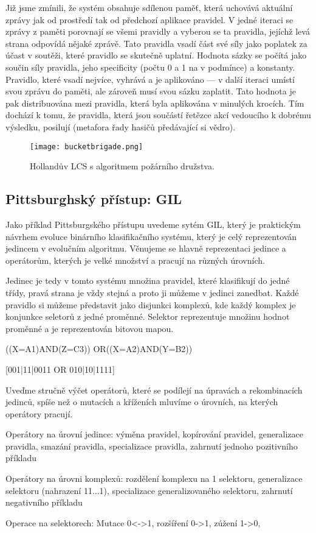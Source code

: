 Již jsme zmínili, že systém obsahuje sdílenou paměť, která uchovává aktuální zprávy jak od prostředí tak od předchozí aplikace pravidel. V jedné iteraci se zprávy z paměti porovnají se všemi pravidly a vyberou se ta pravidla, jejíchž levá strana odpovídá nějaké zprávě. Tato pravidla vsadí část své síly jako poplatek za účast v soutěži, které pravidlo se skutečně uplatní. Hodnota sázky se počítá jako součin síly pravidla, jeho specificity (počtu 0 a 1 na v podmínce) a konstanty. Pravidlo, které vsadí nejvíce, vyhrává a je aplikováno --- v další iteraci umístí svou zprávu do paměti, ale zároveň musí svou sázku zaplatit. Tato hodnota je pak distribuována mezi pravidla, která byla aplikována v minulých krocích. Tím dochází k tomu, že pravidla, která jsou součástí řetězce akcí vedoucího k dobrému výsledku, posilují (metafora řady hasičů předávající si vědro).

\begin{figure}
\texttt{[image: bucketbrigade.png]}
\caption{Hollandův LCS s algoritmem požárního družstva.}
\end{figure}


\subsection{Pittsburghský přístup: GIL}

Jako příklad Pittsburgského přístupu uvedeme sytém GIL, který je praktickým návrhem evoluce binárního klasifikačního systému, který je celý reprezentován jedincem v evolučním algoritmu. Věnujeme se hlavně reprezentaci jedince a operátorům, kterých je velké množství a pracují na různých úrovních.

Jedinec je tedy v tomto systému množina pravidel, které klasifikují do jedné třídy, pravá strana je vždy stejná a proto ji můžeme v jedinci zanedbat. Každé pravidlo si můžeme představit jako disjunkci komplexů, kde každý komplex je konjunkce seletorů z jedné proměnné. Selektor reprezentuje množinu hodnot proměnné a je reprezentován bitovou mapou. 

((X=A1)AND(Z=C3)) OR((X=A2)AND(Y=B2))

[001|11|0011 OR 010|10|1111]

Uveďme stručně výčet operátorů, které se podílejí na úpravách a rekombinacích jedinců, spíše než o mutacích a kříženích mluvíme o úrovních, na kterých operátory pracují.

\begin{description}

\item{Operátory na úrovní jedince:}
výměna pravidel, kopírování pravidel, generalizace pravidla, smazání pravidla, specializace pravidla, zahrnutí jednoho pozitivního příkladu

\item{Operátory na úrovni komplexů:} 
rozdělení komplexu na 1 selektoru, generalizace selektoru (nahrazení 11...1), specializace generalizovaného selektoru, zahrnutí negativního příkladu

\item{Operace na selektorech:}
Mutace 0<->1, rozšíření 0->1, zúžení 1->0, 

\end{description}


